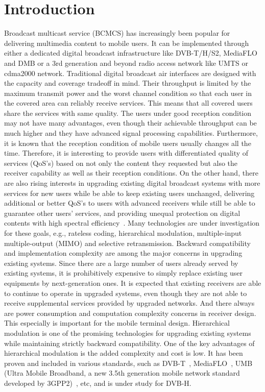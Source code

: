 \documentclass[conference]{IEEEtran}
\begin{document}
\section{Introduction}
Broadcast multicast service (BCMCS) has increasingly been popular
for delivering multimedia content to mobile users. It can be
implemented through either a dedicated digital broadcast
infrastructure like DVB-T/H/S2, MediaFLO and DMB or a 3rd
generation and beyond radio access network like UMTS or cdma2000
network. Traditional digital broadcast air interfaces are designed
with the capacity and coverage tradeoff in mind. Their throughput
is limited by the maximum transmit power and the worst channel
condition so that each user in the covered area can reliably
receive services. This means that all covered users share the
services with same quality. The users under good reception
condition may not have many advantages, even though their
achievable throughput can be much higher and they have advanced
signal processing capabilities. Furthermore, it is known that the
reception condition of mobile users usually changes all the time.
Therefore, it is interesting to provide users with differentiated
quality of services (QoS's) based on not only the content they
requested but also the receiver capability as well as their
reception conditions. On the other hand, there are also rising
interests in upgrading existing digital broadcast systems with
more services for new users while be able to keep existing users
unchanged, delivering additional or better QoS's to users with
advanced receivers while still be able to guarantee other users'
services, and providing unequal protection on digital contents
with high spectral efficiency~\cite{DVB,MediaFLO,Jiang05,UMB}.
Many technologies are under investigation for these goals, e.g.,
rateless coding, hierarchical modulation, multiple-input
multiple-output (MIMO) and selective retransmission. Backward
compatibility and implementation complexity are among the major
concerns in upgrading existing systems. Since there are a large
number of users already served by existing systems, it is
prohibitively expensive to simply replace existing user equipments
by next-generation ones. It is expected that existing receivers
are able to continue to operate in upgraded systems, even though
they are not able to receive supplemental services provided by
upgraded networks. And there always are power consumption and
computation complexity concerns in receiver design. This
especially is important for the mobile terminal design.
Hierarchical modulation is one of the promising technologies for
upgrading existing systems while maintaining strictly backward
compatibility. One of the key advantages of hierarchical
modulation is the added complexity and cost is low. It has been
proven and included in various standards, such as
DVB-T~\cite{DVB}, MediaFLO~\cite{MediaFLO}, UMB (Ultra Mobile
Broadband, a new 3.5th generation mobile network standard
developed by 3GPP2)~\cite{UMB}, etc, and is under study for DVB-H.
\end{document}

